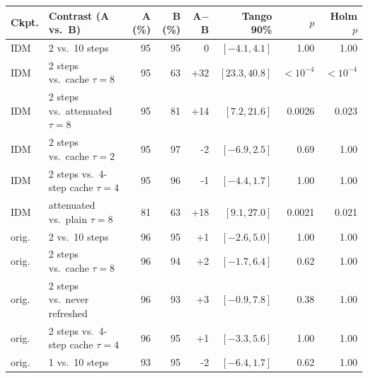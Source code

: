 \begin{tabular}{@{}llrrrrrr@{}}
\toprule
Ckpt. & Contrast (A vs.\ B) & A (\%) & B (\%) & A$-$B & Tango 90\% & $p$ & Holm $p$ \\
\midrule
IDM & 2 vs.\ 10 steps & 95 & 95 & 0 & $[-4.1, 4.1]$ & 1.00 & 1.00 \\
IDM & 2 steps vs.\ cache $\tau{=}8$ & 95 & 63 & +32 & $[23.3, 40.8]$ & $<10^{-4}$ & $<10^{-4}$ \\
IDM & 2 steps vs.\ attenuated $\tau{=}8$ & 95 & 81 & +14 & $[7.2, 21.6]$ & 0.0026 & 0.023 \\
IDM & 2 steps vs.\ cache $\tau{=}2$ & 95 & 97 & -2 & $[-6.9, 2.5]$ & 0.69 & 1.00 \\
IDM & 2 steps vs.\ 4-step cache $\tau{=}4$ & 95 & 96 & -1 & $[-4.4, 1.7]$ & 1.00 & 1.00 \\
IDM & attenuated vs.\ plain $\tau{=}8$ & 81 & 63 & +18 & $[9.1, 27.0]$ & 0.0021 & 0.021 \\
\midrule
orig. & 2 vs.\ 10 steps & 96 & 95 & +1 & $[-2.6, 5.0]$ & 1.00 & 1.00 \\
orig. & 2 steps vs.\ cache $\tau{=}8$ & 96 & 94 & +2 & $[-1.7, 6.4]$ & 0.62 & 1.00 \\
orig. & 2 steps vs.\ never refreshed & 96 & 93 & +3 & $[-0.9, 7.8]$ & 0.38 & 1.00 \\
orig. & 2 steps vs.\ 4-step cache $\tau{=}4$ & 96 & 95 & +1 & $[-3.3, 5.6]$ & 1.00 & 1.00 \\
orig. & 1 vs.\ 10 steps & 93 & 95 & -2 & $[-6.4, 1.7]$ & 0.62 & 1.00 \\
\bottomrule
\end{tabular}
